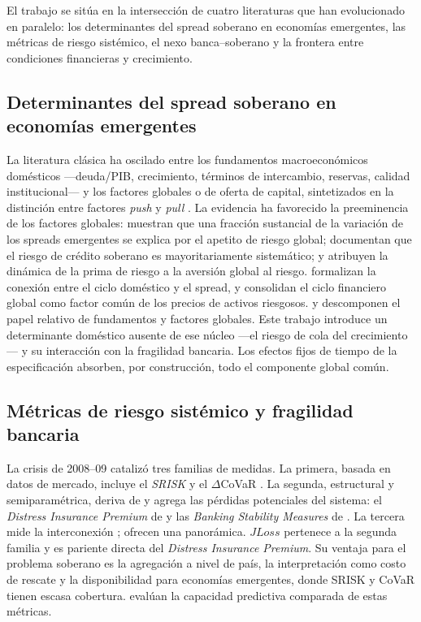 El trabajo se sitúa en la intersección de cuatro literaturas que han evolucionado en paralelo: los determinantes del spread soberano en economías emergentes, las métricas de riesgo sistémico, el nexo banca--soberano y la frontera entre condiciones financieras y crecimiento.

\subsection{Determinantes del spread soberano en economías emergentes}

La literatura clásica ha oscilado entre los fundamentos macroeconómicos domésticos ---deuda/PIB, crecimiento, términos de intercambio, reservas, calidad institucional--- \citep{Edwards1984,HilscherNosbusch2010} y los factores globales o de oferta de capital, sintetizados en la distinción entre factores \textit{push} y \textit{pull} \citep{CalvoLeidermanReinhart1996}. La evidencia ha favorecido la preeminencia de los factores globales: \citet{GonzalezRozadaLevyYeyati2008} muestran que una fracción sustancial de la variación de los spreads emergentes se explica por el apetito de riesgo global; \citet{LongstaffEtAl2011} documentan que el riesgo de crédito soberano es mayoritariamente sistemático; y \citet{RemolonaScatignaWu2008} atribuyen la dinámica de la prima de riesgo a la aversión global al riesgo. \citet{UribeYue2006} formalizan la conexión entre el ciclo doméstico y el spread, y \citet{MirandaAgrippinoRey2022} consolidan el ciclo financiero global como factor común de los precios de activos riesgosos. \citet{CavalloValenzuela2010} y \citet{CsontoIvaschenko2013} descomponen el papel relativo de fundamentos y factores globales. Este trabajo introduce un determinante doméstico ausente de ese núcleo ---el riesgo de cola del crecimiento--- y su interacción con la fragilidad bancaria. Los efectos fijos de tiempo de la especificación absorben, por construcción, todo el componente global común.

\subsection{Métricas de riesgo sistémico y fragilidad bancaria}

La crisis de 2008--09 catalizó tres familias de medidas. La primera, basada en datos de mercado, incluye el \textit{SRISK} \citep{AcharyaEtAl2017b,BrownleesEngle2016} y el $\Delta$CoVaR \citep{AdrianBrunnermeier2016b}. La segunda, estructural y semiparamétrica, deriva de \citet{Merton1974b} y agrega las pérdidas potenciales del sistema: el \textit{Distress Insurance Premium} de \citet{HuangZhouZhu2009} y las \textit{Banking Stability Measures} de \citet{SegovianoGoodhart2009}. La tercera mide la interconexión \citep{BillioEtAl2012}; \citet{BisiasEtAl2012} ofrecen una panorámica. $JLoss$ pertenece a la segunda familia y es pariente directa del \textit{Distress Insurance Premium}. Su ventaja para el problema soberano es la agregación a nivel de país, la interpretación como costo de rescate y la disponibilidad para economías emergentes, donde SRISK y CoVaR tienen escasa cobertura. \citet{GiglioKellyPruitt2016} evalúan la capacidad predictiva comparada de estas métricas.

